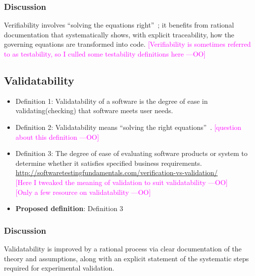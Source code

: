 \documentclass[letterpaper,cleveref]{lipics-v2019}
\newcommand{\authornote}[3]{\textcolor{#1}{[#3 ---#2]}}
\newcommand{\authornote}[3]{}
\newcommand{\oo}[1]{\authornote{magenta}{OO}{#1}} %
\theoremstyle{definition}
\begin{document}
\subsubsection{Discussion}
Verifiability involves ``solving the equations right''~\cite[p.~23]{Roache1998};
it benefits from rational documentation that systematically shows, with explicit
traceability, how the governing equations are transformed into code.
\oo{Verifiability is sometimes referred to as testability, so I culled some testability definitions here}\\
\subsection{Validatability}
\begin{itemize}
\item{Definition 1:} Validatability of a software is the degree of ease in validating(checking) that software meets user needs.\\
\item{Definition 2:} Validatability means ``solving the right equations''~\cite[p.~23]{Roache1998}.
\oo{question about this definition}\\
\item{Definition 3:} The degree of ease of evaluating software products or system to determine whether it satisfies specified business requirements. \url{http://softwaretestingfundamentals.com/verification-vs-validation/}\\
\oo{Here I tweaked the meaning of validation to suit validatability}\\
\oo{Only a few resource on validatability}\\
\item{\textbf{Proposed definition}:} Definition 3
\end{itemize}
\subsubsection{Discussion}
Validatability is improved by a rational process via clear documentation of the
theory and assumptions, along with an explicit statement of the systematic steps
required for experimental validation.
\end{document}

